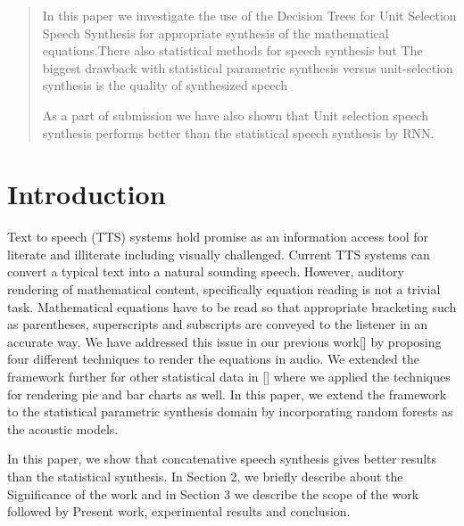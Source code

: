 \documentclass{acm_proc_article-sp}
\begin{document}
\maketitle
\begin{abstract}

In this paper we investigate the use of  the Decision Trees for Unit Selection Speech Synthesis for appropriate synthesis of the mathematical equations.There also statistical methods for speech synthesis but The biggest drawback with statistical parametric synthesis versus unit-selection synthesis is the quality of synthesized speech

As a part of submission we have also shown that Unit selection speech synthesis performs better than the statistical speech synthesis by RNN.



\end{abstract}





\section{Introduction}
Text to speech (TTS) systems hold promise as an information access tool for literate and illiterate including visually challenged. Current TTS systems can convert a typical text into a natural sounding speech. However, auditory rendering of mathematical content, specifically equation reading is not a trivial task. Mathematical equations have to be read so that appropriate bracketing such as parentheses, superscripts and subscripts are conveyed to the listener in an accurate way. We have addressed this issue in our previous work[] by proposing four different techniques to render the equations in audio. We extended the framework further for other statistical data in [] where we applied the techniques for rendering pie and bar charts as well. In this paper, we extend the framework to the statistical parametric synthesis domain by incorporating random forests as the acoustic models. 
 

 

In this paper, we show that concatenative speech synthesis gives better results than the statistical synthesis. In Section 2, we briefly describe about the Significance of the work and in Section 3 we describe the scope of the work followed by  Present work, experimental results and conclusion.
\end{document}
